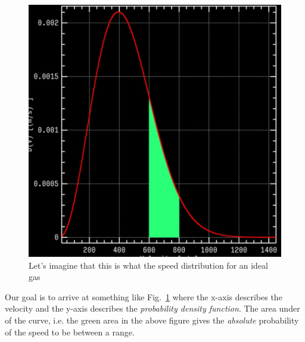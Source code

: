 \documentclass[10pt]{article}
\begin{document}
\begin{figure}[H]
	\centering
	\includegraphics[width=0.8\linewidth]{img/294_l11_prob_density.png}
	\caption{Let's imagine that this is what the speed distribution for an ideal gas}
	\label{fig:294:prob_density}
\end{figure}

Our goal is to arrive at something like Fig.~\ref{fig:294:prob_density} where the x-axis describes the velocity and the y-axis describes the \textit{probability density function}.
The area under of the curve, i.e. the green area in the above figure gives the \textit{absolute}  probability of the speed to be between a range.
\end{document}
